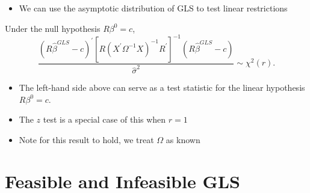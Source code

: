 \documentclass[notes=show]{beamer}
\begin{document}
\begin{frame}%


\begin{itemize}
\item We can use the asymptotic distribution of GLS to test linear
restrictions
\end{itemize}

\begin{theorem}
Under the null hypothesis $R\beta ^{0}=c$,%
\begin{equation*}
\frac{(R\widehat{\beta }^{GLS}-c)^{\prime }[R(X^{\prime }\Omega
^{-1}X)^{-1}R^{\prime }]^{-1}(R\widehat{\beta }^{GLS}-c)}{\hat{\sigma}^{2}}%
\sim \chi ^{2}(r).
\end{equation*}
\end{theorem}

\begin{itemize}
\item The left-hand side above can serve as a test statistic for the linear
hypothesis $R\beta ^{0}=c.$

\item The $z$ test is a special case of this when $r=1$

\item Note for this result to hold, we treat $\Omega $ as known
\end{itemize}

\end{frame}%

\section{Feasible and Infeasible GLS}
\end{document}

